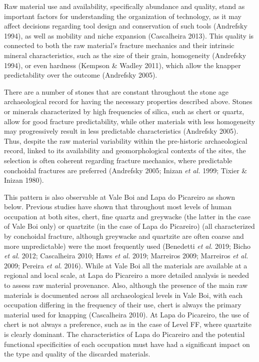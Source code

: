 \documentclass[12pt,twoside]{reedthesis}
\begin{document}
Raw material use and availability, specifically abundance and quality, stand as important factors for understanding the organization of technology, as it may affect decisions regarding tool design and conservation of such tools (Andrefsky 1994), as well as mobility and niche expansion (Cascalheira 2013). This quality is connected to both the raw material's fracture mechanics and their intrinsic mineral characteristics, such as the size of their grain, homogeneity (Andrefsky 1994), or even hardness (Kempson \& Wadley 2011), which allow the knapper predictability over the outcome (Andrefsky 2005).

There are a number of stones that are constant throughout the stone age archaeological record for having the necessary properties described above. Stones or minerals characterized by high frequencies of silica, such as chert or quartz, allow for good fracture predictability, while other materials with less homogeneity may progressively result in less predictable characteristics (Andrefsky 2005). Thus, despite the raw material variability within the pre-historic archaeological record, linked to its availability and geomorphological contexts of the sites, the selection is often coherent regarding fracture mechanics, where predictable conchoidal fractures are preferred (Andrefsky 2005; Inizan \emph{et al.} 1999; Tixier \& Inizan 1980).

This pattern is also observable at Vale Boi and Lapa do Picareiro as shown below. Previous studies have shown that throughout most levels of human occupation at both sites, chert, fine quartz and greywacke (the latter in the case of Vale Boi only) or quartzite (in the case of Lapa do Picareiro) (all characterized by conchoidal fracture, although greywacke and quartzite are often coarse and more unpredictable) were the most frequently used (Benedetti \emph{et al.} 2019; Bicho \emph{et al.} 2012; Cascalheira 2010; Haws \emph{et al.} 2019; Marreiros 2009; Marreiros \emph{et al.} 2009; Pereira \emph{et al.} 2016). While at Vale Boi all the materials are available at a regional and local scale, at Lapa do Picareiro a more detailed analysis is needed to assess raw material provenance. Also, although the presence of the main raw materials is documented across all archaeological levels in Vale Boi, with each occupation differing in the frequency of their use, chert is always the primary material used for knapping (Cascalheira 2010). At Lapa do Picareiro, the use of chert is not always a preference, such as in the case of Level FF, where quartzite is clearly dominant. The characteristics of Lapa do Picareiro and the potential functional specificities of each occupation must have had a significant impact on the type and quality of the discarded materials.
\end{document}

